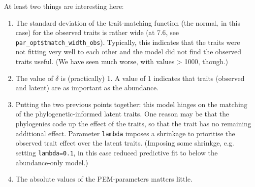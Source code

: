 \documentclass[a4paper, 11pt]{article}\usepackage[]{graphicx}\usepackage[]{color}
\newcommand{\code}[1]{\texttt{#1}}
\begin{document}
At least two things are interesting here:
\begin{enumerate}
  \item The standard deviation of the trait-matching function (the normal, in this case) for the observed traits is rather wide (at 7.6, see \code{par\_opt\$tmatch\_width\_obs}). Typically, this indicates that the traits were not fitting very well to each other and the model did not find the observed traits useful. (We have seen much worse, with values > 1000, though.)
  \item The value of $\delta$ is (practically) 1. A value of 1 indicates that traits (observed and latent) are as important as the abundance.
  \item Putting the two previous points together: this model hinges on the matching of the phylogenetic-informed latent traits. One reason may be that the phylogenies code up the effect of the traits, so that the trait has no remaining additional effect. Parameter \code{lambda} imposes a shrinkage to prioritise the observed trait effect over the latent traits. (Imposing some shrinkge, e.g. setting \code{lambda=0.1}, in this case reduced predictive fit to below the abundance-only model.)
  \item The absolute values of the PEM-parameters matters little.
\end{enumerate}
\end{document}
